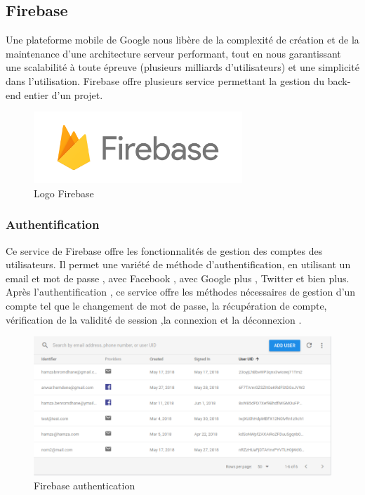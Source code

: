 \documentclass[11pt,a4paper,oneside]{book}
\begin{document}
					\subsection{Firebase}
					Une plateforme mobile de Google nous libère de la complexité de création et de la maintenance d’une architecture serveur performant, tout en nous garantissant une scalabilité à toute épreuve (plusieurs milliards d’utilisateurs) et une simplicité dans l’utilisation. Firebase offre plusieurs service permettant la gestion du back-end entier d’un projet.
					\begin{figure}[H]
						\centering
						\includegraphics[width=0.7\textwidth]{Images/ch4/firebase}
						\caption{Logo Firebase}
						\label{fig:firebase}
					\end{figure}
					\subsubsection{Authentification}
					Ce service de Firebase offre les fonctionnalités de gestion des comptes des utilisateurs.
					Il permet une variété de méthode d’authentification, en utilisant un email et mot de passe , avec Facebook , avec Google plus , Twitter et bien plus.
					Après l’authentification , ce service offre les méthodes nécessaires de gestion d’un compte tel que le changement de mot de passe, la récupération de compte, vérification de la validité de session ,la connexion et la déconnexion .
						
\begin{figure}[H]
	\centering
	\includegraphics[width=1.3\linewidth]{Images/ch4/auth}
	\caption{Firebase authentication}
	\label{fig:auth}
\end{figure}
\end{document}
